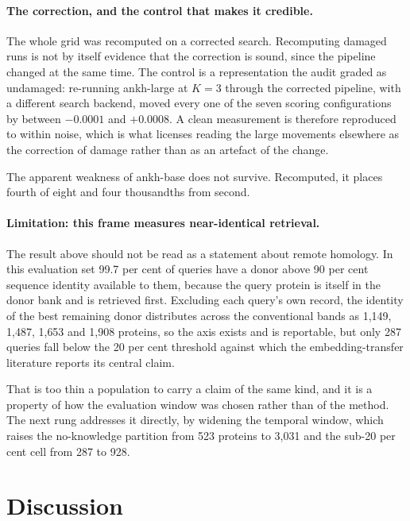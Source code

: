 \paragraph{The correction, and the control that makes it credible.}
The whole grid was recomputed on a corrected search. Recomputing damaged runs is
not by itself evidence that the correction is sound, since the pipeline changed at
the same time. The control is a representation the audit graded as undamaged:
re-running ankh-large at $K{=}3$ through the corrected pipeline, with a different
search backend, moved every one of the seven scoring configurations by between
$-0.0001$ and $+0.0008$. A clean measurement is therefore reproduced to within
noise, which is what licenses reading the large movements elsewhere as the
correction of damage rather than as an artefact of the change.

The apparent weakness of ankh-base does not survive. Recomputed, it places fourth
of eight and four thousandths from second.

\paragraph{Limitation: this frame measures near-identical retrieval.}
The result above should not be read as a statement about remote homology. In this
evaluation set 99.7 per cent of queries have a donor above 90 per cent sequence
identity available to them, because the query protein is itself in the donor bank
and is retrieved first. Excluding each query's own record, the identity of the
best remaining donor distributes across the conventional bands as 1{,}149,
1{,}487, 1{,}653 and 1{,}908 proteins, so the axis exists and is reportable, but
only 287 queries fall below the 20 per cent threshold against which the
embedding-transfer literature reports its central claim.

That is too thin a population to carry a claim of the same kind, and it is a
property of how the evaluation window was chosen rather than of the method. The
next rung addresses it directly, by widening the temporal window, which raises the
no-knowledge partition from 523 proteins to 3{,}031 and the sub-20 per cent cell
from 287 to 928.





\section{Discussion}
\label{sec:discussion}

